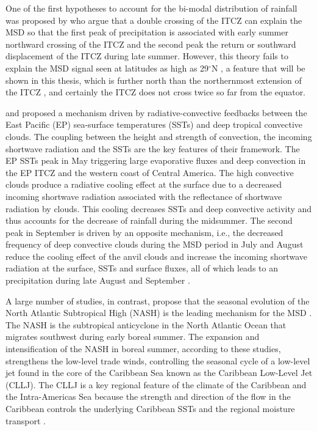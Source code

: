 One of the first hypotheses to account for the bi-modal distribution of rainfall was proposed by \cite{hastenrath1967} who argue that a double crossing of the ITCZ can explain the MSD so that the first peak of precipitation is associated with early summer northward crossing of the ITCZ and the second peak the return or southward displacement of the ITCZ during late summer.
However, this theory fails to explain the MSD signal seen at latitudes as high as 29$^\circ$N \citep{perdigon2018,zhao2020}, a feature that will be shown in this thesis, which is further north than the northernmost extension of the ITCZ \citep{schneider2014}, and certainly the ITCZ does not cross twice so far from the equator. %

\cite{magana1999} and \cite{magana2005} proposed a mechanism driven by radiative-convective feedbacks between the East Pacific (EP) sea-surface temperatures (SSTs) and deep tropical convective clouds. The coupling between the height and strength of convection, the incoming shortwave radiation and the SSTs are the key features of their framework. %
The EP SSTs peak in May triggering large evaporative fluxes and deep convection in the EP ITCZ and the western coast of Central America.
The high convective clouds produce a radiative cooling effect at the surface due to a decreased incoming shortwave radiation associated with the reflectance of shortwave radiation by clouds.
This cooling  decreases SSTs and deep convective activity and thus accounts for the decrease of rainfall during the midsummer.
The second peak in September is driven by an opposite mechanism, i.e., the decreased frequency of deep convective clouds during the MSD period in July and August reduce the cooling effect of the anvil clouds and increase the incoming shortwave radiation at the surface, SSTs and surface fluxes, all of which leads to an precipitation during late August and September \citep{magana1999}.


A large number of studies, in contrast, propose that the seasonal evolution of the North Atlantic Subtropical High (NASH) is the leading mechanism for the MSD \citep[e.g.][]{mapes2005,small2007,gamble2008,curtis2008,munoz2008,martinez2019,corrales2020}. The NASH is the subtropical anticyclone in the North Atlantic Ocean that migrates southwest during early boreal summer. The expansion and intensification of the NASH in boreal summer, according to these studies, strengthens the low-level trade winds, controlling the seasonal cycle of a low-level jet found in the core of the Caribbean Sea known as the Caribbean Low-Level Jet (CLLJ). The CLLJ is a key regional feature of the climate of the Caribbean and the Intra-Americas Sea  because the strength and direction of the flow in the Caribbean controls the underlying Caribbean SSTs and the regional moisture transport \citep{giannini2000,mestas2007,martinez2019,garcia2020sub}. 

